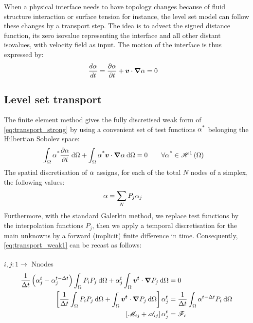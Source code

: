 When a physical interface needs to have topology changes because
of fluid structure interaction or surface tension for instance, the level set model 
can follow these changes by a transport step. The idea is to advect the signed distance
function, its zero isovalue representing the interface and all other distant isovalues, with
velocity field as input. The motion of the interface is thus expressed by:
\begin{align}
\label{eq:transport_strong}
& \frac{d \alpha}{d t}  = \frac{\partial \alpha}{\partial t} + \boldsymbol{v} \cdot \boldsymbol{\nabla} \alpha = 0
\end{align}
%
%
\subsection{Level set transport}
The finite element method gives the fully discretised weak form of \cref{eq:transport_strong} 
by using a convenient set of test functions $\alpha^\text{*}$ belonging the Hilbertian Sobolev space:
\begin{align}
\label{eq:transport_weak1}
&  \int_{\Omega} \alpha^\text{*} \frac{\partial \alpha}{\partial t} \: \mathrm{d}\Omega 
+ \int_{\Omega} \alpha^\text{*} \boldsymbol{v} \cdot \boldsymbol{\nabla} \alpha\: \mathrm{d}\Omega 
= 0
\qquad \forall \alpha^\text{*} \in \mathscr{H}^1 \left( \Omega \right)   
\end{align}
The spatial discretisation of $\alpha$ assigns, for each of the total $N$ nodes of a simplex, the following values:
\begin{align}
\label{eq:transport_weak2}
&  \alpha = \sum_N  P_j \alpha_j
\end{align}
Furthermore, with the standard Galerkin method, we replace test functions by the interpolation functions $P_j$, 
then we apply a temporal discretisation for the main unknowns by a forward (implicit) finite difference in time.
Consequently, \cref{eq:transport_weak1} can be recast as follows:\\ \\
$i,j:1 \rightarrow$ Nnodes
\begin{subequations}
\begin{align}
\label{eq:transport_weak3}
 \frac{1}{\Delta t} \left( \alpha_j^t - \alpha_j^{t-\Delta t} \right)  \int_{\Omega} P_i P_j\: \mathrm{d}\Omega 
	+ \alpha_j^t   \int_{\Omega} \boldsymbol{v^t} \cdot \boldsymbol{\nabla} P_j \: \mathrm{d}\Omega &=  0 \\
\left[ \frac{1}{\Delta t} \int_{\Omega} P_i P_j \: \mathrm{d}\Omega + \int_{\Omega} \boldsymbol{v^t} \cdot \boldsymbol{\nabla} P_j \: \mathrm{d}\Omega \right] \alpha_j^t &= 
\frac{1}{\Delta t}  \int_{\Omega}  \alpha^{t-\Delta t} P_i \: \mathrm{d}\Omega \\
\label{eq:weakform_transport}
\left[ \mathscr{M}_{ij}+\mathscr{A}_{ij} \right] \alpha_j^t &= \mathscr{F}_{i}
\end{align}
\end{subequations}
